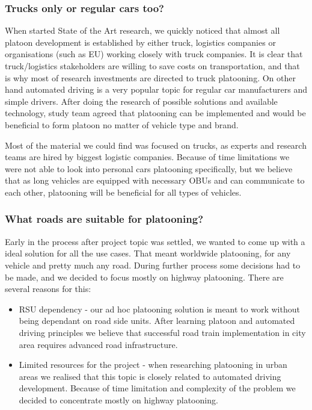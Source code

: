 \subsubsection{Trucks only or regular cars too?}
When started State of the Art research, we quickly noticed that almost all platoon development is established by either truck, logistics companies or organisations (such as EU) working closely with truck companies. It is clear that truck/logistics stakeholders are willing to save costs on transportation, and that is why most of research investments are directed to truck platooning. On other hand automated driving is a very popular topic for regular car manufacturers and simple drivers. After doing the research of possible solutions and available technology, study team agreed that platooning can be implemented and would be beneficial to form platoon no matter of vehicle type and brand.\par
% 
Most of the material we could find was focused on trucks, as experts and research teams are hired by biggest logistic companies. Because of time limitations we were not able to look into personal cars platooning specifically, but we believe that as long vehicles are equipped with necessary OBUs and can communicate to each other, platooning will be beneficial for all types of vehicles.
%
\subsubsection{What roads are suitable for platooning?}
Early in the process after project topic was settled, we wanted to come up with a ideal solution for all the use cases. That meant worldwide platooning, for any vehicle and pretty much any road. During further process some decisions had to be made, and we decided to focus mostly on highway platooning. There are several reasons for this:
\begin{itemize}
    \item RSU dependency - our ad hoc platooning solution is meant to work without being dependant on road side units. After learning platoon and automated driving principles we believe that successful road train implementation in city area requires advanced road infrastructure.
    \item Limited resources for the project - when researching platooning in urban areas we realised that this topic is closely related to automated driving development. Because of time limitation and complexity of the problem we decided to concentrate mostly on highway platooning.
\end{itemize}
%
